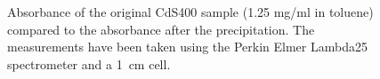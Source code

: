 \documentclass[cits]{JINST}
\begin{document}
\begin{figure}
      \begin{center}
        \caption[]{Absorbance of the original CdS400 sample (1.25 mg/ml in toluene) compared to the absorbance after the precipitation. The measurements have been taken using the Perkin Elmer Lambda25 spectrometer and a 1~cm cell. \label{cds400_precipitation}}
        \end{center}
\end{figure}
\end{document}
